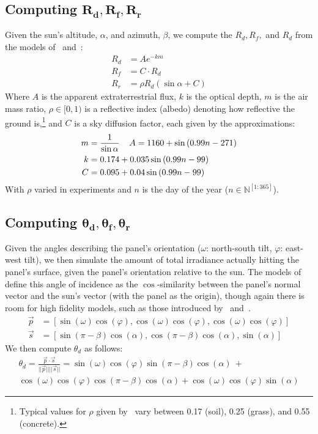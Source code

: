 \documentclass{article}
\begin{document}
\subsection{Computing $\pmb{R_d, R_f, R_r}$}
Given the sun's altitude, $\alpha$, and azimuth, $\beta$, we compute the $R_d, R_f,$ and $R_d$ from the models of~\citet{threlkeld1957direct,Liu1960} and~\citet{masters2013renewable}:
\begin{align}
R_d &= A e^{-km} \\
R_f &= C \cdot R_d \\
R_r &= \rho R_d (\sin \alpha + C)
\end{align}
Where $A$ is the apparent extraterrestrial flux, $k$ is the optical depth, $m$ is the air mass ratio, $\rho \in [0,1)$ is a reflective index (albedo) denoting how reflective the ground is,\footnote{Typical values for $\rho$ given by~\citet{mcevoy2003practical} vary between 0.17 (soil), 0.25 (grass), and 0.55 (concrete).} and $C$ is a sky diffusion factor, each given by the approximations:
\begin{align}
m&=\frac{1}{\sin \alpha} \hspace{4mm} A = 1160 + \sin \left(0.99 n- 271\right)\\
k&=0.174 + 0.035 \sin\left( 0.99 n - 99\right)\\
C&=0.095 + 0.04 \sin\left(0.99 n-99\right)
\end{align}
With $\rho$ varied in experiments and $n$ is the day of the year ($n \in \mathbb{N}^{[1:365]}$).

\subsection{Computing $\pmb{\theta_d, \theta_f, \theta_r}$}
Given the angles describing the panel's orientation ($\omega$: north-south tilt, $\varphi$: east-west tilt), we then simulate the amount of total irradiance actually hitting the panel's surface, given the panel's orientation relative to the sun. The models of~\citet{masters2013renewable} define this angle of incidence as the $\cos$-similarity between the panel's normal vector and the sun's vector (with the panel as the origin), though again there is room for high fidelity models, such as those introduced by~\citet{andersen1980comments} and~\citet{klein1977calculation}.
\begin{align*}
\vec{p} &= \left[ \sin(\omega)  \cos(\varphi), \cos(\omega)  \cos(\varphi), \cos(\omega) \cos(\varphi) \right] \\
\vec{s} &= \left[ \sin(\pi - \beta)  \cos(\alpha), \cos(\pi - \beta)  \cos(\alpha), \sin(\alpha) \right]
\end{align*}
We then compute $\theta_d$ as follows:
\begin{multline}
\theta_d = \frac{\vec{p} \cdot \vec{s}}{||\vec{p}|| ||\vec{s} ||} = \sin(\omega)  \cos(\varphi)  \sin(\pi - \beta)  \cos(\alpha)\ + \\
\cos(\omega)  \cos(\varphi)  \cos(\pi - \beta)  \cos(\alpha) +  \cos(\omega) \cos(\varphi)  \sin(\alpha) 
\end{multline}
\end{document}
